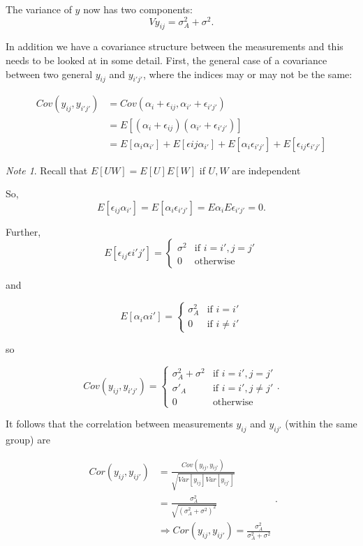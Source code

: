 \documentclass[12pt,a4paper]{article}
\theoremstyle{regla}
\theoremstyle{remark}
\newtheorem{notes}{Note}[section]
\theoremstyle{definition}
\theoremstyle{nonumberbreak}
\begin{document}
The variance of $y$ now has two components:
$$Vy_{ij}=\sigma^2_A + \sigma^2.$$


In addition we have a covariance structure between the measurements and this needs to be looked at in some detail. First, the general case of a covariance between two general $y_{ij}$ and $y_{i'j'}$, where the indices may or may not be the same:

\begin{eqnarray*}
Cov(y_{ij},y_{i'j'}) &=Cov(\alpha_i+\epsilon_{ij}, \alpha_{i'}+ \epsilon_{i'j'})\\
                     &=E[(\alpha_i+\epsilon_{ij})(\alpha_{i'}+\epsilon_{i'j'})]\\
                     &=E[\alpha_i\alpha_{i'}] + E[\epsilon{ij}\alpha_{i'}]+ E[\alpha_i\epsilon_{i'j'}] + E[\epsilon_{ij}\epsilon_{i'j'}]
\end{eqnarray*}

\begin{notes}
Recall that $E[UW]=E[U]E[W]$ if $U,W$ are independent
\end{notes}

So,
$$E[\epsilon_{ij}\alpha_{i'}]=E[\alpha_i\epsilon_{i'j'}] = E\alpha_iE\epsilon_{i'j'}=0 .$$

Further,
$$E[\epsilon_{ij}\epsilon{i'j'}] =
  \begin{cases}
  \sigma^2 & \text{if } i=i', j=j'\\
  0 &\text{otherwise} 
\end{cases}$$

and

$$ 
E[\alpha_{i}\alpha{i'}] =
\begin{cases}
\sigma^2_A &\text{if } i=i'\\
0 &\text{if }i \neq i' 
\end{cases}
$$

so

$$ Cov(y_{ij},y_{i'j'}) = 
\begin{cases}
  \sigma_A^2+\sigma^2 & \text{if } i=i', j=j'\\
  \sigma'_A & \text{if } i=i', j \neq j'\\
  0 & \text{otherwise}
\end{cases}. $$

It follows that the correlation between measurements $y_{ij}$ and $y_{ij'}$ (within the same group) are

$$
\begin{align*}
Cor(y_{ij},y_{ij'}) &= \frac{Cov(y_{ij},y_{ij'})}{\sqrt{Var[y_{ij}]Var[y_{ij'}]}}\\
                   &= \frac{\sigma_A^2}{\sqrt{(\sigma_A^2 + \sigma^2)^2}}\\
                   &\Rightarrow Cor(y_{ij}, y_{ij'}) = \frac{\sigma_A^2}{\sigma_A^2 + \sigma^2}
\end{align*}.
$$
\end{document}
